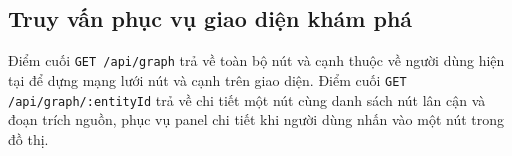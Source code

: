 \subsection{Truy vấn phục vụ giao diện khám phá}
Điểm cuối \texttt{GET /api/graph} trả về toàn bộ nút và cạnh thuộc về người dùng hiện tại để dựng mạng lưới nút và cạnh trên giao diện. Điểm cuối \texttt{GET /api/graph/:entityId} trả về chi tiết một nút cùng danh sách nút lân cận và đoạn trích nguồn, phục vụ panel chi tiết khi người dùng nhấn vào một nút trong đồ thị.
